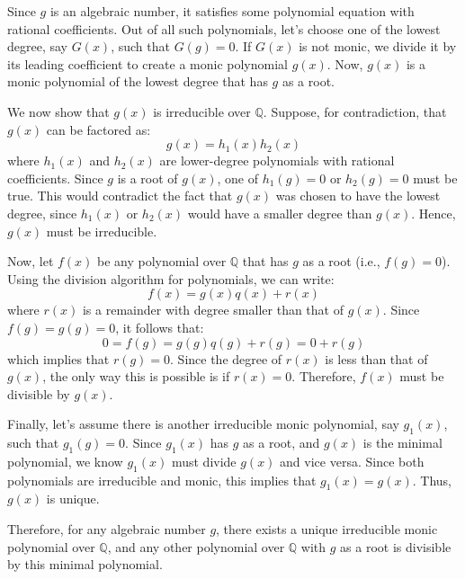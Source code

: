 \documentclass{article}
\newenvironment{proofbox}
  {\begin{mdframed}[linewidth=1pt,linecolor=black,backgroundcolor=white]\noindent\ignorespaces}
  {\end{mdframed}}
\begin{document}
    \begin{proofbox}
 
Since \( g \) is an algebraic number, it satisfies some polynomial equation with rational coefficients. Out of all such polynomials, let’s choose one of the lowest degree, say \( G(x) \), such that \( G(g) = 0 \). If \( G(x) \) is not monic, we divide it by its leading coefficient to create a monic polynomial \( g(x) \). Now, \( g(x) \) is a monic polynomial of the lowest degree that has \( g \) as a root.

We now show that \( g(x) \) is irreducible over \( \mathbb{Q} \). Suppose, for contradiction, that \( g(x) \) can be factored as:
\[
g(x) = h_1(x) h_2(x)
\]
where \( h_1(x) \) and \( h_2(x) \) are lower-degree polynomials with rational coefficients. Since \( g \) is a root of \( g(x) \), one of \( h_1(g) = 0 \) or \( h_2(g) = 0 \) must be true. This would contradict the fact that \( g(x) \) was chosen to have the lowest degree, since \( h_1(x) \) or \( h_2(x) \) would have a smaller degree than \( g(x) \). Hence, \( g(x) \) must be irreducible.

Now, let \( f(x) \) be any polynomial over \( \mathbb{Q} \) that has \( g \) as a root (i.e., \( f(g) = 0 \)). Using the division algorithm for polynomials, we can write:
\[
f(x) = g(x) q(x) + r(x)
\]
where \( r(x) \) is a remainder with degree smaller than that of \( g(x) \). Since \( f(g) = g(g) = 0 \), it follows that:
\[
0 = f(g) = g(g) q(g) + r(g) = 0 + r(g)
\]
which implies that \( r(g) = 0 \). Since the degree of \( r(x) \) is less than that of \( g(x) \), the only way this is possible is if \( r(x) = 0 \). Therefore, \( f(x) \) must be divisible by \( g(x) \).

Finally, let's assume there is another irreducible monic polynomial, say \( g_1(x) \), such that \( g_1(g) = 0 \). Since \( g_1(x) \) has \( g \) as a root, and \( g(x) \) is the minimal polynomial, we know \( g_1(x) \) must divide \( g(x) \) and vice versa. Since both polynomials are irreducible and monic, this implies that \( g_1(x) = g(x) \). Thus, \( g(x) \) is unique.

Therefore, for any algebraic number \( g \), there exists a unique irreducible monic polynomial over \( \mathbb{Q} \), and any other polynomial over \( \mathbb{Q} \) with \( g \) as a root is divisible by this minimal polynomial.
    \end{proofbox}
\end{document}
